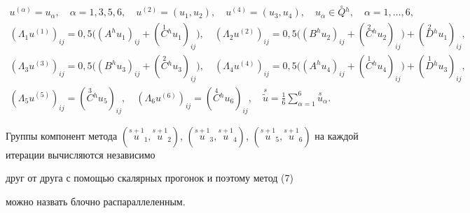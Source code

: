 \begin{gather*}


u^{(\alpha)}=u_\alpha,\quad \alpha=1,3,5,6,\quad u^{(2)}=(u_1,u_2),\quad


u^{(4)}=(u_3,u_4),\quad


u_\alpha\in\overset{\circ}{Q}{}^h,\quad \alpha=1,\dotsc,6, \\


%


(\Lambda_1u^{(1)})_{ij}=0,5\bigl((A^hu_1)_{ij}+


(\overset{1}{C}{}^hu_1)_{ij}\bigr),\quad


(\Lambda_2u^{(2)})_{ij}=0,5\bigl((B^hu_2)_{ij}+


(\overset{2}{C}{}^hu_2)_{ij}\bigr)+


(\overset{2}{D}{}^hu_1)_{ij}, \\


%


(\Lambda_3u^{(3)})_{ij}=0,5\bigl((B^hu_3)_{ij}+


(\overset{2}{C}{}^hu_3)_{ij}\bigr),\quad


(\Lambda_4u^{(4)})_{ij}=0,5\bigl((A^hu_4)_{ij}+


(\overset{1}{C}{}^hu_4)_{ij}\bigr)+


(\overset{1}{D}{}^hu_3)_{ij}, \\


%


(\Lambda_5u^{(5)})_{ij}=(\overset{3}{C}{}^hu_5)_{ij},\quad


(\Lambda_6u^{(6)})_{ij}=(\overset{4}{C}{}^hu_6)_{ij},\quad


\overset{s}{\tilde u}=\frac16


\sum_{\alpha=1}^6\overset{s}{u}_\alpha.


\end{gather*}


Группы компонент метода $(\overset{s+1}{u}_{\!\!\!1},


\overset{s+1}{u}_{\!\!\!2})$, $(\overset{s+1}{u}_{\!\!\!3},


\overset{s+1}{u}_{\!\!\!4})$, $(\overset{s+1}{u}_{\!\!\!5},


\overset{s+1}{u}_{\!\!\!6})$ на каждой итерации вычисляются независимо


друг от друга с помощью скалярных прогонок и поэтому метод (7)


можно назвать блочно распараллеленным.





